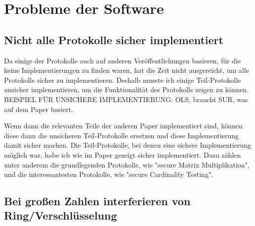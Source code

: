 \chapter{Probleme der Software}

\section{Nicht alle Protokolle sicher implementiert}
Da einige der Protokolle auch auf anderen Veröffentlichungen basieren, für die keine Implementierungen zu finden waren, hat die Zeit nicht ausgereicht, um alle Protokolle sicher zu implementieren. Deshalb musste ich einige Teil-Protokolle unsicher implementieren, um die Funktionalität des Protokolls zeigen zu können.\\
BEISPIEL  FÜR UNSICHERE IMPLEMENTIERUNG:
OLS, braucht SUR, was auf dem Paper \cite{tcc-2007-3673} basiert.

Wenn dann die relevanten Teile der anderen Paper implementiert sind, können diese dann die unsicheren Teil-Protokolle ersetzen und diese Implementierung damit sicher machen.
Die Teil-Protokolle, bei denen eine sichere Implementierung möglich war, habe ich wie im Paper gezeigt sicher implementiert. Dazu zählen unter anderem die grundlegenden Protokolle, wie "secure Matrix Multiplikation", und die interessantesten Protokolle, wie "secure Cardinality Testing".\\



\section{Bei großen Zahlen interferieren von Ring/Verschlüsselung}